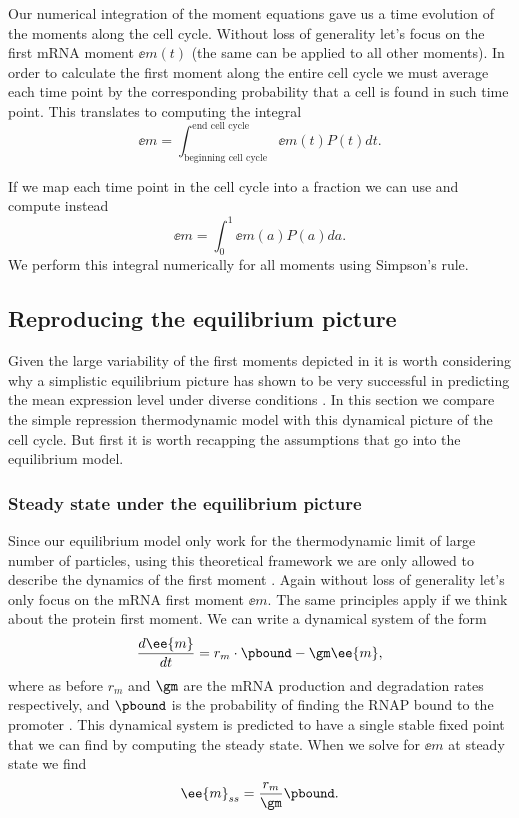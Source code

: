 Our numerical integration of the moment equations gave us a time evolution of
the moments along the cell cycle. Without loss of generality let's focus on the
first mRNA moment $\ee{m(t)}$ (the same can be applied to all other moments).
In order to calculate the first moment along the entire cell cycle we must
average each time point by the corresponding probability that a cell is found
in such time point. This translates to computing the integral
\begin{equation}
  \ee{m} = \int_{\text{beginning cell cycle}}^{\text{end cell cycle}}
                       \ee{m(t)} P(t) dt.
\end{equation}

If we map each time point in the cell cycle into a fraction we can use
 and compute instead
\begin{equation}
  \ee{m} = \int_0^1 \ee{m(a)} P(a) da.
  \label{eq_moment_avg}
\end{equation}
We perform this integral numerically for all moments using Simpson's rule.

\subsection{Reproducing the equilibrium picture}

Given the large variability of the first moments depicted in
 it is worth considering why a simplistic equilibrium
picture has shown to be very successful in predicting the mean expression level
under diverse conditions \cite{Garcia2011c, Brewster2014, Barnes2018,
Razo-Mejia2018}. In this section we compare the simple repression thermodynamic
model with this dynamical picture of the cell cycle. But first it is worth
recapping the assumptions that go into the equilibrium model.

\subsubsection{Steady state under the equilibrium picture}

Since our equilibrium model only work for the thermodynamic limit of large
number of particles, using this theoretical framework we are only allowed to
describe the dynamics of the first moment \cite{Phillips2015}. Again without
loss of generality let's only focus on the mRNA first moment $\ee{m}$. The same
principles apply if we think about the protein first moment. We can write a
dynamical system of the form
\begin{equation}
  {d \ee{m} \over dt} = r_m \cdot \pbound - \gm \ee{m},
\end{equation}
where as before $r_m$ and $\gm$ are the mRNA production and degradation rates
respectively, and $\pbound$ is the probability of finding the RNAP
bound to the promoter \cite{Bintu2005a}. This dynamical system is predicted to
have a single stable fixed point that we can find by computing the steady state.
When we solve for $\ee{m}$ at steady state we find
\begin{equation}
  \ee{m}_{ss} = {r_m \over \gm} \pbound.
\end{equation}

